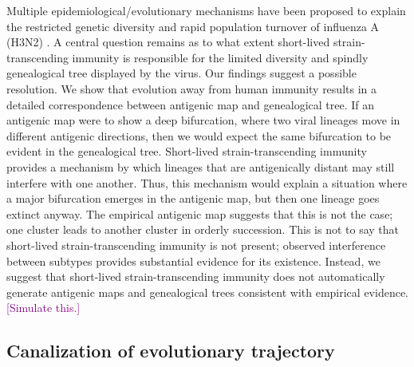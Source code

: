 \documentclass[11pt,oneside,letterpaper]{article}
\def\tbc#1{\textcolor{purple}{[#1]}}
\begin{document}
Multiple epidemiological/evolutionary mechanisms have been proposed to explain the restricted genetic diversity and rapid population turnover of influenza A (H3N2) \cite{Ferguson03,Tria05,Koelle06,Recker07}.  A central question remains as to what extent short-lived strain-transcending immunity is responsible for the limited diversity and spindly genealogical tree displayed by the virus.  Our findings suggest a possible resolution.  We show that evolution away from human immunity results in a detailed correspondence between antigenic map and genealogical tree.  If an antigenic map were to show a deep bifurcation, where two viral lineages move in different antigenic directions, then we would expect the same bifurcation to be evident in the genealogical tree.  Short-lived strain-transcending immunity provides a mechanism by which lineages that are antigenically distant may still interfere with one another.  Thus, this mechanism would explain a situation where a major bifurcation emerges in the antigenic map, but then one lineage goes extinct anyway.  The empirical antigenic map \cite{Smith04} suggests that this is not the case; one cluster leads to another cluster in orderly succession.  This is not to say that short-lived strain-transcending immunity is not present; observed interference between subtypes \cite{Ferguson03,Goldstein11} provides substantial evidence for its existence.  Instead, we suggest that short-lived strain-transcending immunity does not automatically generate antigenic maps and genealogical trees consistent with empirical evidence.  \tbc{Simulate this.}

\subsection*{Canalization of evolutionary trajectory}
\end{document}
